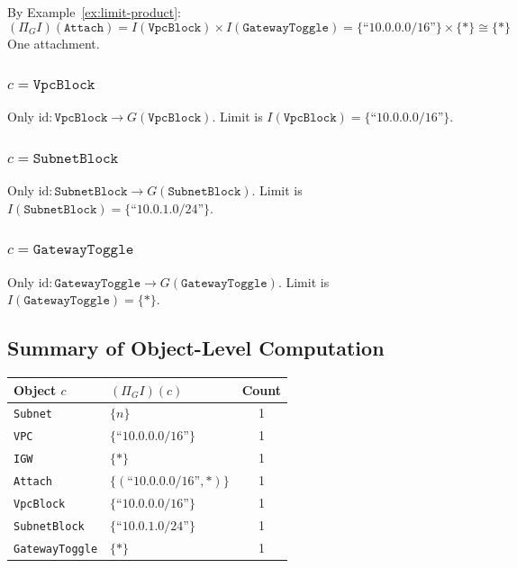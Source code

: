 \documentclass[11pt,a4paper]{article}
\theoremstyle{definition}
\theoremstyle{plain}
\newcommand{\id}{\mathrm{id}}
\begin{document}
By Example~\ref{ex:limit-product}:
\[
(\Pi_G I)(\texttt{Attach}) = I(\texttt{VpcBlock}) \times I(\texttt{GatewayToggle}) = \{\text{``10.0.0.0/16''}\} \times \{*\} \cong \{*\}
\]
One attachment.

\subsubsection*{$c = \texttt{VpcBlock}$}

Only $\id \colon \texttt{VpcBlock} \to G(\texttt{VpcBlock})$. Limit is $I(\texttt{VpcBlock}) = \{\text{``10.0.0.0/16''}\}$.

\subsubsection*{$c = \texttt{SubnetBlock}$}

Only $\id \colon \texttt{SubnetBlock} \to G(\texttt{SubnetBlock})$. Limit is $I(\texttt{SubnetBlock}) = \{\text{``10.0.1.0/24''}\}$.

\subsubsection*{$c = \texttt{GatewayToggle}$}

Only $\id \colon \texttt{GatewayToggle} \to G(\texttt{GatewayToggle})$. Limit is $I(\texttt{GatewayToggle}) = \{*\}$.

\subsection{Summary of Object-Level Computation}

\begin{center}
\begin{tabular}{llc}
\toprule
\textbf{Object $c$} & \textbf{$(\Pi_G I)(c)$} & \textbf{Count} \\
\midrule
\texttt{Subnet}        & $\{n\}$ & 1 \\
\texttt{VPC}           & $\{\text{``10.0.0.0/16''}\}$ & 1 \\
\texttt{IGW}           & $\{*\}$ & 1 \\
\texttt{Attach}        & $\{(\text{``10.0.0.0/16''}, *)\}$ & 1 \\
\texttt{VpcBlock}      & $\{\text{``10.0.0.0/16''}\}$ & 1 \\
\texttt{SubnetBlock}   & $\{\text{``10.0.1.0/24''}\}$ & 1 \\
\texttt{GatewayToggle} & $\{*\}$ & 1 \\
\bottomrule
\end{tabular}
\end{center}
\end{document}
